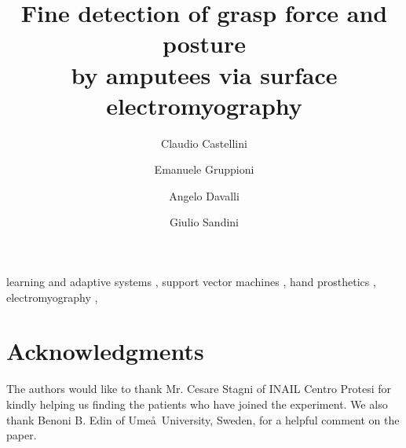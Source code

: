 \documentclass[review,authoryear]{elsarticle}
\begin{document}
\begin{frontmatter}

\title{Fine detection of grasp force and posture\\
by amputees via surface electromyography}

\author[liralab]{Claudio Castellini}
\author[inail]{Emanuele Gruppioni}
\author[inail]{Angelo Davalli}
\author[iit]{Giulio Sandini}

\address[liralab]{LIRA-Lab, University of Genova,
  viale F. Causa 13, 16145 Genova (Italy)}
\address[inail]{INAIL Centro Protesi,
  via Rabuina 14, 40054 Vigorso di Budrio (Bologna, Italy)}
\address[iit]{RBCS Department, Italian Institute of Technology,
  via Morego 30, 16163 Genova (Italy)}


\begin{abstract}
  
\end{abstract}

\begin{keyword}
  learning and adaptive systems \sep
  support vector machines \sep
  hand prosthetics \sep
  electromyography \sep  
\end{keyword}

\end{frontmatter}






\section*{Acknowledgments}

The authors would like to thank Mr. Cesare Stagni of INAIL Centro
Protesi for kindly helping us finding the patients who have joined the
experiment. We also thank Benoni B. Edin of Ume\aa\ University,
Sweden, for a helpful comment on the paper.



\end{document}
